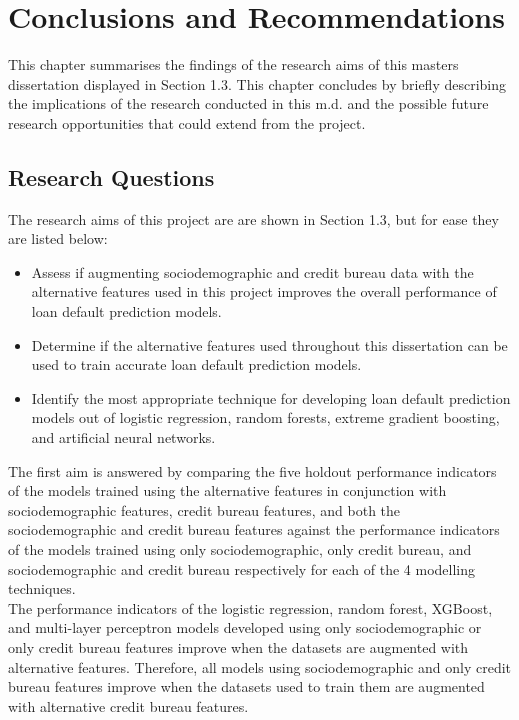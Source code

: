 \chapter{Conclusions and Recommendations} 
\label{Chapter6}

This chapter summarises the findings of the research aims of this masters dissertation displayed in Section 1.3. This chapter concludes by briefly describing the implications of the research conducted in this m.d. and the possible future research opportunities that could extend from the project.\\

\section{Research Questions}

The research aims of this project are are shown in Section 1.3, but for ease they are listed below:

\begin{itemize}
    \item Assess if augmenting sociodemographic and credit bureau data with the alternative features used in this project improves the overall performance of loan default prediction models.
    \item Determine if the alternative features used throughout this dissertation can be used to train accurate loan default prediction models. 
    \item Identify the most appropriate technique for developing loan default prediction models out of logistic regression, random forests, extreme gradient boosting, and artificial neural networks. 
\end{itemize}

\vspace{10pt}

The first aim is answered by comparing the five holdout performance indicators of the models trained using the alternative features in conjunction with sociodemographic features, credit bureau features, and both the sociodemographic and credit bureau features against the performance indicators of the models trained using only sociodemographic, only credit bureau, and sociodemographic and credit bureau respectively for each of the 4 modelling techniques. \\

The performance indicators of the logistic regression, random forest, XGBoost, and multi-layer perceptron models developed using only sociodemographic or only credit bureau features improve when the datasets are augmented with alternative features. Therefore, all models using sociodemographic and only credit bureau features improve when the datasets used to train them are augmented with alternative credit bureau features. \\

